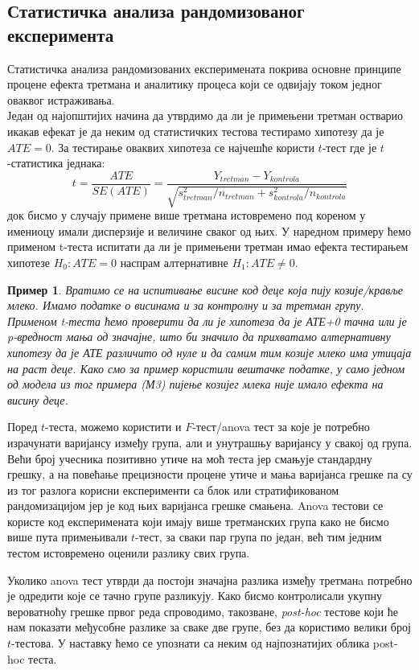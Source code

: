 \documentclass[12pt, a4paper]{article}
\newtheorem{primer}{Пример}[section]
\begin{document}
\subsection{Статистичка анализа рандомизованог експеримента}

Статистичка анализа рандомизованих експеримената покрива основне принципе процене ефекта третмана 
и аналитику процеса који се одвијају током једног оваквог истраживања.\\
Један од најопштијих начина да утврдимо да ли је примењени третман остварио икакав ефекат је да 
неким од статистичких тестова тестирамо хипотезу да је $ATE=0$. За тестирање оваквих хипотеза се 
најчешће користи $t$-тест где је $t$-статистика једнака:
$$
t=\frac{ATE}{SE(ATE)}=\frac{Y_{tretman}-Y_{kontrola}}{\sqrt{s_{tretman}^2/n_{tretman}+s_{kontrola}^2/n_{kontrola}}}
$$
док бисмо у случају примене више третмана истовремено под кореном у имениоцу имали дисперзије и 
величине сваког од њих. У наредном примеру ћемо применом t-теста испитати да ли је примењени 
третман имао ефекта тестирањем хипотезе $H_0: ATE=0$ наспрам алтернативне $H_1: ATE\neq0$.

\begin{primer}
Вратимо се на испитивање висине код деце која пију козије/кравље млеко. Имамо податке о висинама и 
за контролну и за третман групу. Применом t-теста ћемо проверити да ли је хипотеза да је АТЕ+0 
тачна или је p-вредност мања од значајне, што би значило да прихватамо алтернативну хипотезу 
да је АТЕ различито од нуле и да самим тим козије млеко има утицаја на раст деце. Како смо за пример 
користили вештачке податке, у само једном од модела из тог примера (М3) пијење козијег млека није 
имало ефекта на висину деце.
\end{primer}

Поред $t$-теста, можемо користити и $F$-тест/anova тест за које је потребно израчунати варијансу 
између група, али и унутрашњу варијансу у свакој од група. Већи број учесника позитивно утиче на 
моћ теста јер смањује стандардну грешку, а на повећање прецизности процене утиче и мања варијанса 
грешке па су из тог разлога корисни експерименти са блок или стратификованом рандомизацијом јер 
је код њих варијанса грешке смањена. Anova тестови се користе код експеримената који имају више 
третманских група како не бисмо више пута примењивали $t$-тест, за сваки пар група по један, већ 
тим једним тестом истовремено оценили разлику свих група.

Уколико anova тест утврди да постоји значајна разлика између третманa потребно је одредити које 
се тачно групе разликују. Како бисмо контролисали укупну вероватноћу грешке првог реда спроводимо, 
такозване, \textit{post-hoc} тестове који ће нам показати међусобне разлике за сваке две групе, 
без да користимо велики број $t$-тестова. У наставку ћемо се упознати са неким од најпознатијих 
облика post-hoc теста.
\end{document}
